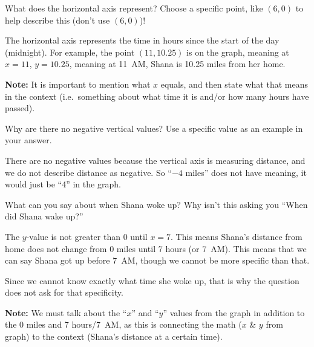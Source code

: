 \documentclass[12pt]{ximera}
\begin{document}
\begin{problem}
What does the horizontal axis represent? Choose a specific point, like $(6,0)$ to help
describe this (don't use $(6,0)$)!

\begin{freeResponse}
\end{freeResponse}

\begin{solution}
The horizontal axis represents the time in hours since the start of the day
(midnight). For example, the point $(11, 10.25)$ is on the graph, meaning at $x = 11$,
$y = 10.25$, meaning at 11~AM, Shana is 10.25 miles from her home.

\textbf{Note:} It is important to mention what $x$ equals, and then state what that
means in the context (i.e.\ something about what time it is and/or how many hours have
passed).
\end{solution}
\end{problem}

\begin{problem}
Why are there no negative vertical values? Use a specific value as an example in your
answer.

\begin{freeResponse}
\end{freeResponse}

\begin{solution}
There are no negative values because the vertical axis is measuring distance, and we
do not describe distance as negative. So ``$-4$ miles'' does not have meaning, it
would just be ``4'' in the graph.
\end{solution}
\end{problem}

\begin{problem}
What can you say about when Shana woke up? Why isn't this asking you ``When did Shana
wake up?''

\begin{freeResponse}
\end{freeResponse}

\begin{solution}
The $y$-value is not greater than 0 until $x = 7$. This means Shana's distance from
home does not change from 0 miles until 7 hours (or 7~AM). This means that we can say
Shana got up before 7~AM, though we cannot be more specific than that.

Since we cannot know exactly what time she woke up, that is why the question does not
ask for that specificity.

\textbf{Note:} We must talk about the ``$x$'' and ``$y$'' values from the graph in
addition to the 0 miles and 7 hours/7~AM, as this is connecting the math ($x$ \& $y$
from graph) to the context (Shana's distance at a certain time).
\end{solution}
\end{problem}
\end{document}

